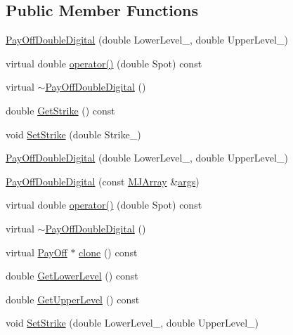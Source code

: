 \subsection*{Public Member Functions}
\begin{DoxyCompactItemize}
\item 
\hyperlink{classPayOffDoubleDigital_a2638053513b5df1016d3b57162a02bbd}{Pay\+Off\+Double\+Digital} (double Lower\+Level\+\_\+, double Upper\+Level\+\_\+)
\item 
virtual double \hyperlink{classPayOffDoubleDigital_a158d8976f26fbb2ae1508d5e945e32d9}{operator()} (double Spot) const
\item 
virtual \hyperlink{classPayOffDoubleDigital_adc7cd94c9210b08afb93f6771bef2e10}{$\sim$\+Pay\+Off\+Double\+Digital} ()
\item 
double \hyperlink{classPayOffDoubleDigital_a58e92fda1c78721ff68494aafd42616e}{Get\+Strike} () const
\item 
void \hyperlink{classPayOffDoubleDigital_a2c0474c7433e29ca53a156086d1ac47b}{Set\+Strike} (double Strike\+\_\+)
\item 
\hyperlink{classPayOffDoubleDigital_a2638053513b5df1016d3b57162a02bbd}{Pay\+Off\+Double\+Digital} (double Lower\+Level\+\_\+, double Upper\+Level\+\_\+)
\item 
\hyperlink{classPayOffDoubleDigital_a55e59bf193a3d4a6a57ccdf0095cf08f}{Pay\+Off\+Double\+Digital} (const \hyperlink{classMJArray}{M\+J\+Array} \&\hyperlink{path__generation_8h_a75c13cde2074f502cc4348c70528572d}{args})
\item 
virtual double \hyperlink{classPayOffDoubleDigital_a158d8976f26fbb2ae1508d5e945e32d9}{operator()} (double Spot) const
\item 
virtual \hyperlink{classPayOffDoubleDigital_adc7cd94c9210b08afb93f6771bef2e10}{$\sim$\+Pay\+Off\+Double\+Digital} ()
\item 
virtual \hyperlink{classPayOff}{Pay\+Off} $\ast$ \hyperlink{classPayOffDoubleDigital_a27dab8d62e8262d190853b0a4eea3bf3}{clone} () const
\item 
double \hyperlink{classPayOffDoubleDigital_aa99991381645852dbb7ce2ab1a622699}{Get\+Lower\+Level} () const
\item 
double \hyperlink{classPayOffDoubleDigital_ad82002fa94591747e352019de909da04}{Get\+Upper\+Level} () const
\item 
void \hyperlink{classPayOffDoubleDigital_a7c5ba80dfded5f9a88865cc437d92227}{Set\+Strike} (double Lower\+Level\+\_\+, double Upper\+Level\+\_\+)
\end{DoxyCompactItemize}
